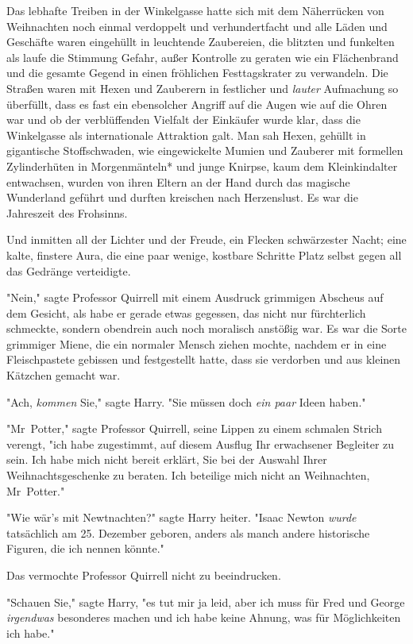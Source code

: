 {Das lebhafte Treiben in der Winkelgasse hatte sich mit dem Näherrücken von Weihnachten noch einmal verdoppelt und verhundertfacht und alle Läden und Geschäfte waren eingehüllt in leuchtende Zaubereien, die blitzten und funkelten als laufe die Stimmung Gefahr, außer Kontrolle zu geraten wie ein Flächenbrand und die gesamte Gegend in einen fröhlichen Festtagskrater zu verwandeln. Die Straßen waren mit Hexen und Zauberern in festlicher und \emph{lauter} Aufmachung so überfüllt, dass es fast ein ebensolcher Angriff auf die Augen wie auf die Ohren war und ob der verblüffenden Vielfalt der Einkäufer wurde klar, dass die Winkelgasse als internationale Attraktion galt. Man sah Hexen, gehüllt in gigantische Stoffschwaden, wie eingewickelte Mumien und Zauberer mit formellen Zylinderhüten in Morgenmänteln* und junge Knirpse, kaum dem Kleinkindalter entwachsen, wurden von ihren Eltern an der Hand durch das magische Wunderland geführt und durften kreischen nach Herzenslust. Es war die Jahreszeit des Frohsinns.

Und inmitten all der Lichter und der Freude, ein Flecken schwärzester Nacht; eine kalte, finstere Aura, die eine paar wenige, kostbare Schritte Platz selbst gegen all das Gedränge verteidigte.

"Nein," sagte Professor Quirrell mit einem Ausdruck grimmigen Abscheus auf dem Gesicht, als habe er gerade etwas gegessen, das nicht nur fürchterlich schmeckte, sondern obendrein auch noch moralisch anstößig war. Es war die Sorte grimmiger Miene, die ein normaler Mensch ziehen mochte, nachdem er in eine Fleischpastete gebissen und festgestellt hatte, dass sie verdorben und aus kleinen Kätzchen gemacht war.

"Ach, \emph{kommen} Sie," sagte Harry. "Sie müssen doch \emph{ein paar} Ideen haben."

"Mr~Potter," sagte Professor Quirrell, seine Lippen zu einem schmalen Strich verengt, "ich habe zugestimmt, auf diesem Ausflug Ihr erwachsener Begleiter zu sein. Ich habe mich nicht bereit erklärt, Sie bei der Auswahl Ihrer Weihnachtsgeschenke zu beraten. Ich beteilige mich nicht an Weihnachten, Mr~Potter."

"Wie wär's mit Newtnachten?" sagte Harry heiter. "Isaac Newton \emph{wurde} tatsächlich am 25. Dezember geboren, anders als manch andere historische Figuren, die ich nennen könnte."

Das vermochte Professor Quirrell nicht zu beeindrucken.

"Schauen Sie," sagte Harry, "es tut mir ja leid, aber ich muss für Fred und George \emph{irgendwas} besonderes machen und ich habe keine Ahnung, was für Möglichkeiten ich habe."

}
